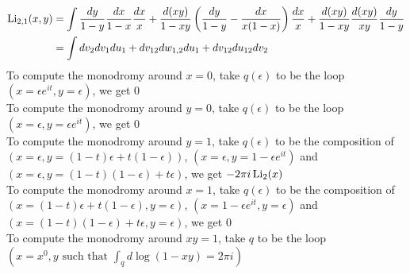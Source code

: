 \documentclass[main]{subfiles}
\begin{document}
\begin{align*}
\operatorname{Li}_{2,1}(x,y)&=\int\frac{dy}{1-y}\frac{dx}{1-x}\frac{dx}{x}+\frac{d(xy)}{1-xy}\left(\frac{dy}{1-y}-\frac{dx}{x(1-x)}\right)\frac{dx}{x}+\frac{d(xy)}{1-xy}\frac{d(xy)}{xy}\frac{dy}{1-y} \\
&=\int dv_2dv_1du_1+dv_{12}dw_{1,2}du_1+dv_{12}du_{12}dv_2
\end{align*}
To compute the monodromy around $x=0$, take $q(\epsilon)$ to be the loop $(x=\epsilon e^{it},y=\epsilon)$, we get $0$ \\
To compute the monodromy around $y=0$, take $q(\epsilon)$ to be the loop $(x=\epsilon,y=\epsilon e^{it})$, we get $0$ \\
To compute the monodromy around $y=1$, take $q(\epsilon)$ to be the composition of $(x=\epsilon,y=(1-t)\epsilon+t(1-\epsilon))$, $(x=\epsilon,y=1-\epsilon e^{it})$ and $(x=\epsilon,y=(1-t)(1-\epsilon)+t\epsilon)$, we get $-2\pi i\operatorname{Li}_2(x)$ \\
To compute the monodromy around $x=1$, take $q(\epsilon)$ to be the composition of $(x=(1-t)\epsilon+t(1-\epsilon),y=\epsilon)$, $(x=1-\epsilon e^{it},y=\epsilon)$ and $(x=(1-t)(1-\epsilon)+t\epsilon,y=\epsilon)$, we get $0$ \\
To compute the monodromy around $xy=1$, take $q$ to be the loop $(x=x^0,y\text{ such that }\int_qd\log(1-xy)=2\pi i)$
\end{document}
